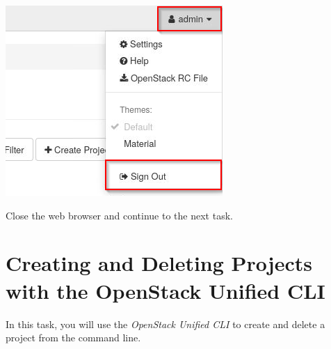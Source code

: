 \documentclass[letterpaper, 12pt]{article}
\begin{document}
\begin{enumerate}
\begin{labstep}
        \begin{center}
            \includegraphics[scale=0.65]{images/part1/step9.png}
        \end{center}
    \end{labstep}

    \begin{labstep}
        Close the web browser and continue to the next task.
    \end{labstep}
\end{enumerate}

\section{Creating and Deleting Projects with the OpenStack Unified CLI}\label{sec:create_and_delete_projects_using_the_openstack_unified_cli}
In this task, you will use the \textit{OpenStack Unified CLI} to create and delete a project from the command line.
\end{document}
